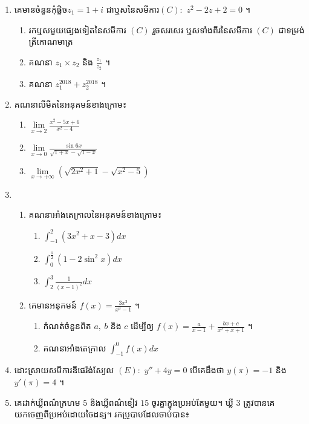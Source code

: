 \documentclass[a4paper, 11pt]{exam}
\begin{document}
\begin{enumerate}[I]
	\item គេមានចំនួនកុំផ្លិច​ $z_1=1+i$ ជាឬសនៃសមីការ​ $(C):$ $z^2-2z+2=0$ ។
	\begin{enumerate}[a]
		\item រកឬសមួយផ្សេងទៀតនៃសមីការ $(C)$ រួចសរសេរ ឬសទាំងពីរនៃសមីការ $(C)$ ជាទម្រង់ត្រីកោណមាត្រ
		\item គណនា $z_1\times z_2$ និង $\frac{z_1}{z_2}$ ។
		\item គណនា $z_1^{2018} + z_2^{2018}$ ។
	\end{enumerate}
	\item គណនាលីមីតនៃអនុគមន៍ខាងក្រោម៖
	\begin{multicols}{3}
		\begin{enumerate}[a]
			\item $\lim\limits_{x\to2} \frac{x^2-5x+6}{x^2-4}$
			\item $\lim\limits_{x\to 0} \frac{\sin6x}{\sqrt{1+x}-\sqrt{1-x}}$
			\item $\lim\limits_{x\to+\infty} (\sqrt{2x^2+1}-\sqrt{x^2-5})$
		\end{enumerate}
	\end{multicols}
	\item \begin{enumerate}[1]
		\item គណនាអាំងតេក្រាលនៃអនុគមន៍ខាងក្រោម៖
		\begin{multicols}{3}
			\begin{enumerate}[a]
				\item $\int_{-1}^{2}(3x^2+x-3)dx$
				\item $\int_{0}^{\frac{\pi}{2}} (1-2\sin^2x)dx$
				\item $\int_{2}^{3}\frac{1}{(x-1)^2}dx$
			\end{enumerate}
		\end{multicols}
		\item គេមានអនុគមន៍ $f(x)=\frac{3x^2}{x^3-1}$ ។
		\begin{enumerate}[a]
			\item កំណត់ចំនួនពិត $a, ~b$ និង $c$ ដើម្បីឲ្យ $f(x)=\frac{a}{x-1}+\frac{bx+c}{x^2+x+1}$ ។
			\item គណនាអាំងតេក្រាល $\int_{-1}^{0} f(x) dx$ 
		\end{enumerate}
	\end{enumerate}
	\item ដោះស្រាយសមីការឌីផេរ៉ង់ស្យែល $(E):$ $y''+4y = 0$ បើគេដឹងថា $y(\pi) =-1$ និង $y'(\pi) =4$ ។ 
	\item គេដាក់ឃ្លីពណ៌ក្រហម $5$ និងឃ្លីពណ៌ខៀវ $15$ ចូរគ្នាក្នុងប្រអប់តែមួយ។ ឃ្លី $3$ ត្រូវបានគេយកចេញពីប្រអប់ដោយចៃដន្យ។ រកប្រូបាបដែលចាប់បាន៖

\end{enumerate}
\end{document}
